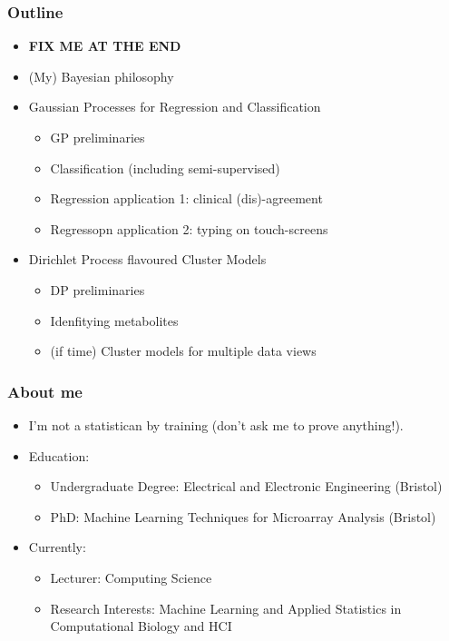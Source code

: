 \begin{frame}
	\frametitle{Outline}
	\begin{itemize}
		\item {\bf FIX ME AT THE END}
		\item (My) Bayesian philosophy
		\item Gaussian Processes for Regression and Classification
		\begin{itemize}
			\item GP preliminaries
			\item Classification (including semi-supervised)
			\item Regression application 1: clinical (dis)-agreement
			\item Regressopn application 2: typing on touch-screens
		\end{itemize}
		\item Dirichlet Process flavoured Cluster Models
		\begin{itemize}
			\item DP preliminaries
			\item Idenfitying metabolites
			\item (if time) Cluster models for multiple data views
		\end{itemize}
	\end{itemize}
\end{frame}

\begin{frame}
	\frametitle{About me}
	\begin{itemize}
		\item I'm not a statistican by training (don't ask me to prove anything!).
		\item Education:
		\begin{itemize}
			\item Undergraduate Degree: Electrical and Electronic Engineering (Bristol)
			\item PhD: Machine Learning Techniques for Microarray Analysis (Bristol)
		\end{itemize}
		\item Currently:
		\begin{itemize}
			\item Lecturer: Computing Science
			\item Research Interests: Machine Learning and Applied Statistics in Computational Biology and \ac{HCI}
		\end{itemize}
	\end{itemize}
	
\end{frame}